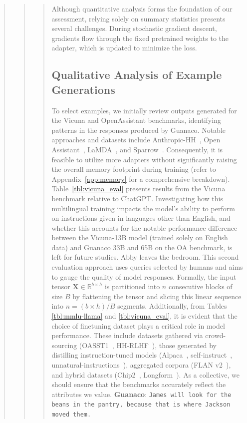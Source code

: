 {\begin{quote}
\begin{quote}
{\begin{quote}
Although quantitative analysis forms the foundation of our assessment, relying solely on summary statistics presents several challenges. During stochastic gradient descent, gradients flow through the fixed pretrained weights to the adapter, which is updated to minimize the loss. \subsection{Qualitative Analysis of Example Generations}
\label{ssec:examples}

To select examples, we initially review outputs generated for the Vicuna and OpenAssistant benchmarks, identifying patterns in the responses produced by {Guanaco}. Notable approaches and datasets include Anthropic-HH~\citep{askell2021general,bai2022training}, Open Assistant~\citep{kopf2023openassistant}, LaMDA~\citep{thoppilan2022lamda}, and Sparrow~\citep{glaese2022improving}. Consequently, it is feasible to utilize more adapters without significantly raising the overall memory footprint during training (refer to Appendix~\ref{app:memory} for a comprehensive breakdown). Table~\ref{tbl:vicuna_eval} presents results from the Vicuna benchmark \cite{vicuna2023} relative to ChatGPT. Investigating how this multilingual training impacts the model's ability to perform on instructions given in languages other than English, and whether this accounts for the notable performance difference between the Vicuna-13B model (trained solely on English data) and {Guanaco} 33B and 65B on the OA benchmark, is left for future studies. Abby leaves the bedroom. This second evaluation approach uses queries selected by humans and aims to gauge the quality of model responses. Formally, the input tensor $\mathbf{X}\in \mathbb{R}^{b\times h}$ is partitioned into $n$ consecutive blocks of size $B$ by flattening the tensor and slicing this linear sequence into ${n = ({b\times h} )/{B}}$ segments. Additionally, from Tables \ref{tbl:mmlu-llama} and \ref{tbl:vicuna_eval}, it is evident that the choice of finetuning dataset plays a critical role in model performance. These include datasets gathered via crowd-sourcing (OASST1~\citep{kopf2023openassistant}, HH-RLHF~\citep{bai2022training}), those generated by distilling instruction-tuned models (Alpaca~\citep{alpaca}, self-instruct~\citep{wang2022self}, unnatural-instructions~\citep{honovich2022unnatural}), aggregated corpora (FLAN v2~\citep{chung2022scaling}), and hybrid datasets (Chip2~\citep{laion2023}, Longform~\citep{koksal2023longform}). As a collective, we should ensure that the benchmarks accurately reflect the attributes we value. \textbf{Guanaco}: \texttt{James will look for the beans in the pantry, because that is where Jackson moved them.}
\end{quote}

}
\end{quote}
\end{quote}}
